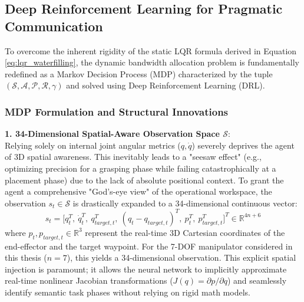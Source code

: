 \subsection{Deep Reinforcement Learning for Pragmatic Communication}
To overcome the inherent rigidity of the static LQR formula derived in Equation \ref{eq:lqr_waterfilling}, the dynamic bandwidth allocation problem is fundamentally redefined as a Markov Decision Process (MDP) characterized by the tuple $(\mathcal{S}, \mathcal{A}, \mathcal{P}, \mathcal{R}, \gamma)$ and solved using Deep Reinforcement Learning (DRL).

\subsubsection{MDP Formulation and Structural Innovations}

\noindent\textbf{1. 34-Dimensional Spatial-Aware Observation Space $\mathcal{S}$}:\\
Relying solely on internal joint angular metrics ($q, \dot{q}$) severely deprives the agent of 3D spatial awareness. This inevitably leads to a "seesaw effect" (e.g., optimizing precision for a grasping phase while failing catastrophically at a placement phase) due to the lack of absolute positional context. To grant the agent a comprehensive "God's-eye view" of the operational workspace, the observation $s_t\in\mathcal{S}$ is drastically expanded to a 34-dimensional continuous vector:
\begin{equation}
    s_t = \Big[ q_t^T, \ \dot{q}_t^T, \ q_{target, t}^T, \ (q_t - q_{target, t})^T, \ p_t^T, \ p_{target, t}^T \Big]^T \in \mathbb{R}^{4n+6}
\end{equation}
where $p_t, p_{target, t} \in \mathbb{R}^3$ represent the real-time 3D Cartesian coordinates of the end-effector and the target waypoint. For the 7-DOF manipulator considered in this thesis ($n=7$), this yields a 34-dimensional observation. This explicit spatial injection is paramount; it allows the neural network to implicitly approximate real-time nonlinear Jacobian transformations ($J(q) = \partial p / \partial q$) and seamlessly identify semantic task phases without relying on rigid math models.

